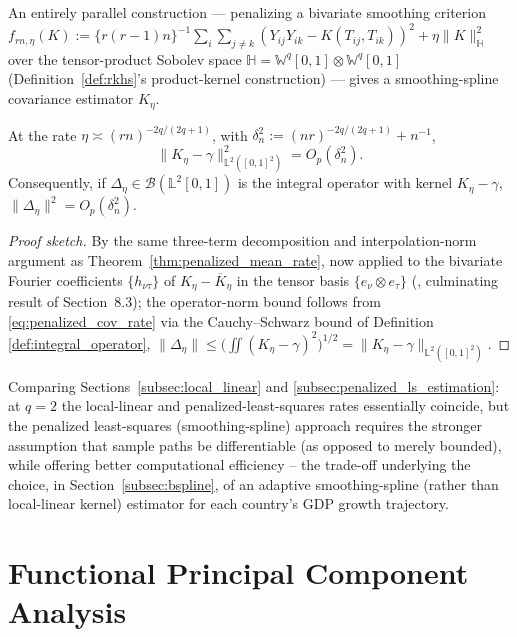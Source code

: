 An entirely parallel construction --- penalizing a bivariate smoothing
criterion $f_{rn,\eta}(K):=\{r(r-1)n\}^{-1}\sum_{i}\sum_{j\neq k}(Y_{ij}
Y_{ik}-K(T_{ij},T_{ik}))^2+\eta\|K\|_{\mathbb{H}}^2$ over the tensor-product
Sobolev space $\mathbb{H}=\mathbb{W}^q[0,1]\otimes\mathbb{W}^q[0,1]$
(Definition~\ref{def:rkhs}'s product-kernel construction) --- gives a
smoothing-spline covariance estimator $K_\eta$.

\begin{theorem}
\label{thm:penalized_cov_rate}
At the rate $\eta\asymp(rn)^{-2q/(2q+1)}$, with $\delta_n^2:=(nr)^{-2q/(2q+1)}
+n^{-1}$,
\begin{equation}
\|K_\eta-\gamma\|_{\mathbb{L}^2([0,1]^2)}^2 = O_p(\delta_n^2).
\label{eq:penalized_cov_rate}
\end{equation}
Consequently, if $\Delta_\eta\in\mathcal{B}(\mathbb{L}^2[0,1])$ is the
integral operator with kernel $K_\eta-\gamma$, $\|\Delta_\eta\|^2 =
O_p(\delta_n^2)$.
\end{theorem}

\begin{proof}[Proof sketch]
By the same three-term decomposition and interpolation-norm argument as
Theorem~\ref{thm:penalized_mean_rate}, now applied to the bivariate Fourier
coefficients $\{h_{\nu\tau}\}$ of $K_\eta-\overline{K}_\eta$ in the tensor
basis $\{e_\nu\otimes e_\tau\}$ (\cite{hsingeubank2015}, culminating result
of Section~8.3); the operator-norm bound follows from
\eqref{eq:penalized_cov_rate} via the Cauchy--Schwarz bound of Definition
\ref{def:integral_operator}, $\|\Delta_\eta\| \leq \big(\iint(K_\eta-
\gamma)^2\big)^{1/2} = \|K_\eta-\gamma\|_{\mathbb{L}^2([0,1]^2)}$.
\end{proof}

Comparing Sections~\ref{subsec:local_linear} and
\ref{subsec:penalized_ls_estimation}: at $q=2$ the local-linear and
penalized-least-squares rates essentially coincide, but the penalized
least-squares (smoothing-spline) approach requires the stronger assumption
that sample paths be differentiable (as opposed to merely bounded), while
offering better computational efficiency -- the trade-off underlying the
choice, in Section~\ref{subsec:bspline}, of an adaptive smoothing-spline
(rather than local-linear kernel) estimator for each country's GDP growth
trajectory.

\section{Functional Principal Component Analysis}
\label{sec:fpca_theory}

